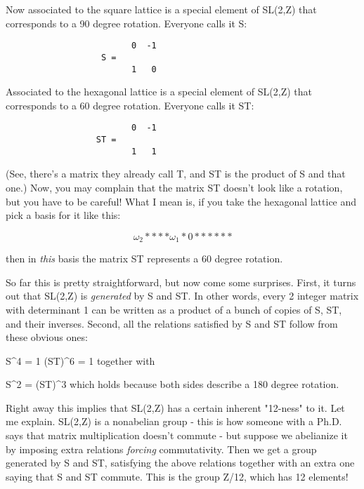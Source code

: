 Now associated to the square lattice is a special element of SL(2,Z)
that corresponds to a 90 degree rotation.   Everyone calls it S:

\begin{verbatim}
                         0  -1
                   S =
                         1   0
\end{verbatim}
    
Associated to the hexagonal lattice is a special element of SL(2,Z) 
that corresponds to a 60 degree rotation.   Everyone calls it ST:

\begin{verbatim}
                         0  -1
                  ST =
                         1   1
\end{verbatim}
    
(See, there's a matrix they already call T, and ST is the product of S
and that one.)  Now, you may complain that the matrix ST doesn't look
like a rotation, but you have to be careful!   What I mean is, if you
take the hexagonal lattice and pick a basis for it like this:

$$
                     \omega _{2}      
                *       *      *      *

                                 \omega _{1}
                    *      0*      *                


                *       *      *      *

$$
    
then in \emph{this} basis the matrix ST represents a 60 degree rotation.

So far this is pretty straightforward, but now come some surprises. 
First, it turns out that SL(2,Z) is \emph{generated} by S and ST.  In other
words, every 2 integer matrix with determinant 1 can be written as a
product of a bunch of copies of S, ST, and their inverses.  Second, all
the relations satisfied by S and ST follow from these obvious ones:

                             S^{4} = 1
                          (ST)^{6} = 1
together with

                          S^{2} = (ST)^{3}
which holds because both sides describe a 180 degree rotation.

Right away this implies that SL(2,Z) has a certain inherent "12-ness" to
it.  Let me explain.  SL(2,Z) is a nonabelian group - this is how
someone with a Ph.D. says that matrix multiplication doesn't commute -
but suppose we abelianize it by imposing extra relations \emph{forcing}
commutativity.  Then we get a group generated by S and ST, satisfying
the above relations together with an extra one saying that S and ST
commute.  This is the group Z/12, which has 12 elements!


